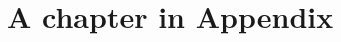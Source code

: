 \documentclass[10pt]{report}
\begin{document}
\nocite{*}

% 

\printbibliography






\appendix

\chapter{A chapter in Appendix}

\blindtext
\end{document}
